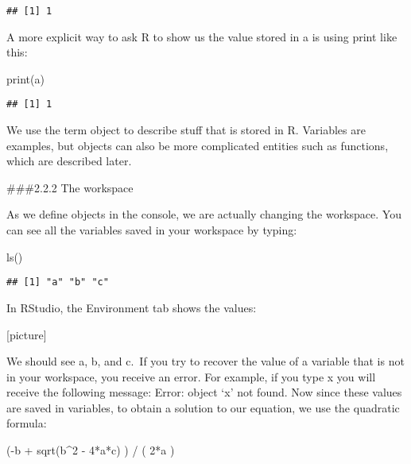 \documentclass[
]{article}
\newenvironment{Shaded}{\begin{snugshade}}{\end{snugshade}}
\newcommand{\DecValTok}[1]{\textcolor[rgb]{0.00,0.00,0.81}{#1}}
\newcommand{\FunctionTok}[1]{\textcolor[rgb]{0.00,0.00,0.00}{#1}}
\newcommand{\NormalTok}[1]{#1}
\newcommand{\SpecialCharTok}[1]{\textcolor[rgb]{0.00,0.00,0.00}{#1}}
\begin{document}
\begin{verbatim}
## [1] 1
\end{verbatim}

A more explicit way to ask R to show us the value stored in a is using
print like this:

\begin{Shaded}
\begin{Highlighting}[]
\FunctionTok{print}\NormalTok{(a)}
\end{Highlighting}
\end{Shaded}

\begin{verbatim}
## [1] 1
\end{verbatim}

We use the term object to describe stuff that is stored in R. Variables
are examples, but objects can also be more complicated entities such as
functions, which are described later.

\#\#\#2.2.2 The workspace

As we define objects in the console, we are actually changing the
workspace. You can see all the variables saved in your workspace by
typing:

\begin{Shaded}
\begin{Highlighting}[]
\FunctionTok{ls}\NormalTok{()}
\end{Highlighting}
\end{Shaded}

\begin{verbatim}
## [1] "a" "b" "c"
\end{verbatim}

In RStudio, the Environment tab shows the values:

{[}picture{]}

We should see a, b, and c.~If you try to recover the value of a variable
that is not in your workspace, you receive an error. For example, if you
type x you will receive the following message: Error: object `x' not
found. Now since these values are saved in variables, to obtain a
solution to our equation, we use the quadratic formula:

\begin{Shaded}
\begin{Highlighting}[]
\NormalTok{(}\SpecialCharTok{{-}}\NormalTok{b }\SpecialCharTok{+} \FunctionTok{sqrt}\NormalTok{(b}\SpecialCharTok{\^{}}\DecValTok{2} \SpecialCharTok{{-}} \DecValTok{4}\SpecialCharTok{*}\NormalTok{a}\SpecialCharTok{*}\NormalTok{c) ) }\SpecialCharTok{/}\NormalTok{ ( }\DecValTok{2}\SpecialCharTok{*}\NormalTok{a )}
\end{Highlighting}
\end{Shaded}
\end{document}
